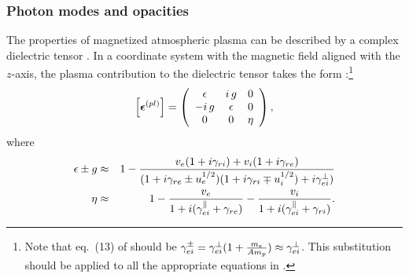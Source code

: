 \documentclass[useAMS,onecolumn,usenatbib,usegraphicx]{mn2e}
\begin{document}
\subsubsection{Photon modes and opacities}
\label{subsubsect:MOSF}

The properties of magnetized atmospheric plasma can be described by a complex dielectric tensor 
\citep[][]{Ginzburg64a}.  In a coordinate system with the magnetic field aligned with the $z$-axis, 
the plasma contribution to the dielectric tensor takes the form \citep[][]{LaiHo03a}:\footnote{Note that 
eq.~(13) of 
\citet[][]{LaiHo03a} should be 
$\gamma_{ei}^{\pm}=\gamma_{ei}^{\perp}(1+{m_e\over A m_p}) \approx \gamma_{ei}^{\perp}$.  This 
substitution should be applied to all the appropriate equations in \citet[][]{LaiHo03a}.}
\begin{eqnarray}
\label{eq:DieTen}
\left[\mbox{\boldmath{$\epsilon$}}^{(pl)}\right] = 
\left (
\begin{array}{ccc}
\epsilon & i\,g & 0 \\ 
-i\,g & \epsilon & 0 \\
0 & 0 & \eta
\end{array}
\right ),
\end{eqnarray}
where
\begin{eqnarray}
\label{eq:epg}
\epsilon\pm g & \approx & 1 - {v_e (1 + i\gamma_{ri}) + v_i (1 + i\gamma_{re})\over (1 + i\gamma_{re} \pm u_e^{1/2} )
	(1 + i\gamma_{ri} \mp u_i^{1/2} ) + i\gamma_{ei}^{\perp})}\\
\label{eq:eta}
\eta & \approx & 1 - {v_e \over 1 + i(\gamma_{ei}^{\parallel}+\gamma_{re})} - {v_i \over 1 + i(\gamma_{ei}^{\parallel}+\gamma_{ri})}.
\end{eqnarray}
\end{document}
